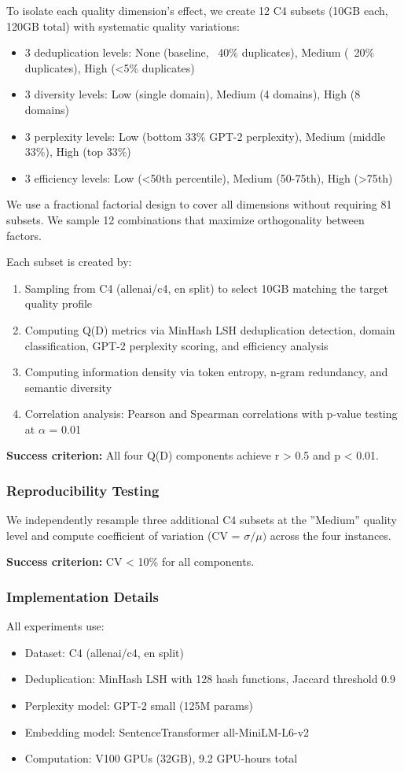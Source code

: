 To isolate each quality dimension's effect, we create 12 C4 subsets (10GB each, 120GB total) with systematic quality variations:

\begin{itemize}
\item 3 deduplication levels: None (baseline, ~40\% duplicates), Medium (~20\% duplicates), High (<5\% duplicates)
\item 3 diversity levels: Low (single domain), Medium (4 domains), High (8 domains)
\item 3 perplexity levels: Low (bottom 33\% GPT-2 perplexity), Medium (middle 33\%), High (top 33\%)
\item 3 efficiency levels: Low (<50th percentile), Medium (50-75th), High (>75th)
\end{itemize}

We use a fractional factorial design to cover all dimensions without requiring 81 subsets. We sample 12 combinations that maximize orthogonality between factors.

Each subset is created by:
\begin{enumerate}
\item Sampling from C4 (allenai/c4, en split) to select 10GB matching the target quality profile
\item Computing Q(D) metrics via MinHash LSH deduplication detection, domain classification, GPT-2 perplexity scoring, and efficiency analysis
\item Computing information density via token entropy, n-gram redundancy, and semantic diversity
\item Correlation analysis: Pearson and Spearman correlations with p-value testing at $\alpha$ = 0.01
\end{enumerate}

\textbf{Success criterion:} All four Q(D) components achieve r > 0.5 and p < 0.01.

\subsubsection{Reproducibility Testing}

We independently resample three additional C4 subsets at the ''Medium'' quality level and compute coefficient of variation (CV = $\sigma /\mu )$ across the four instances.

\textbf{Success criterion:} CV < 10\% for all components.

\subsubsection{Implementation Details}

All experiments use:
\begin{itemize}
\item Dataset: C4 (allenai/c4, en split)
\item Deduplication: MinHash LSH with 128 hash functions, Jaccard threshold 0.9
\item Perplexity model: GPT-2 small (125M params)
\item Embedding model: SentenceTransformer all-MiniLM-L6-v2
\item Computation: V100 GPUs (32GB), 9.2 GPU-hours total
\end{itemize}

